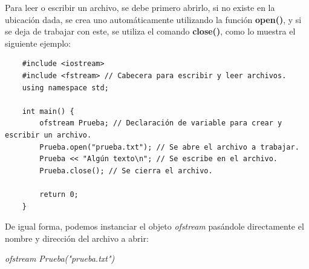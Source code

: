 Para leer o escribir un archivo, se debe primero abrirlo, si no existe en la ubicación dada, se crea uno automáticamente utilizando la función \textbf{open()}, y si se deja de trabajar con este, se utiliza el comando \textbf{close()}, como lo muestra el siguiente ejemplo:
\begin{lstlisting}
    #include <iostream>
    #include <fstream> // Cabecera para escribir y leer archivos.
    using namespace std;
    
    int main() {
        ofstream Prueba; // Declaración de variable para crear y escribir un archivo.
        Prueba.open("prueba.txt"); // Se abre el archivo a trabajar.
        Prueba << "Algún texto\n"; // Se escribe en el archivo.
        Prueba.close(); // Se cierra el archivo.
        
        return 0;
    }
\end{lstlisting}

De igual forma, podemos instanciar el objeto \textit{ofstream} pasándole directamente el nombre y dirección del archivo a abrir:
\begin{center}
	\textit{ofstream Prueba("prueba.txt")}
\end{center}

